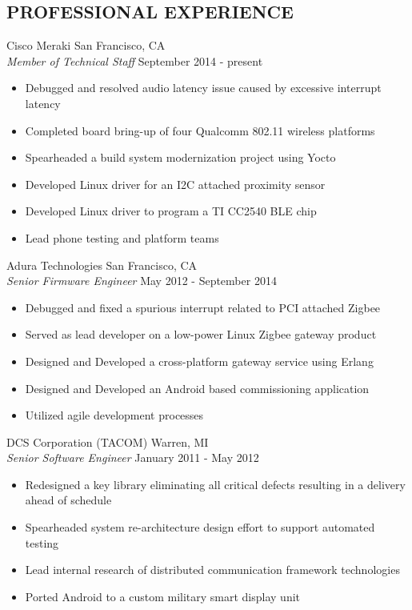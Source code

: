 \documentclass[line]{res}
\begin{document}
\begin{resume}
\section{PROFESSIONAL EXPERIENCE}
    \vspace{1mm}
    Cisco Meraki  \hfill San Francisco, CA\\
    {\sl Member of Technical Staff} \hfill September  2014 - present
    \vspace{1mm}
    \begin{itemize}
        \item Debugged and resolved audio latency issue caused by excessive interrupt latency
        \item Completed board bring-up of four Qualcomm 802.11 wireless platforms
        \item Spearheaded a build system modernization project using Yocto
        \item Developed Linux driver for an I2C attached proximity sensor
        \item Developed Linux driver to program a TI CC2540 BLE chip
        \item Lead phone testing and platform teams
    \end{itemize}
    \vspace{1mm}
    Adura Technologies  \hfill San Francisco, CA\\
    {\sl Senior Firmware Engineer} \hfill May  2012 - September 2014
    \vspace{1mm}
    \begin{itemize}
       \item Debugged and fixed a spurious interrupt related to PCI attached Zigbee
       \item Served as lead developer on a low-power Linux Zigbee gateway product
       \item Designed and Developed a cross-platform gateway service using Erlang
       \item Designed and Developed an Android based commissioning application
       \item Utilized agile development processes
    \end{itemize}
    \vspace{-1mm}
    DCS Corporation (TACOM)  \hfill Warren, MI\\
    {\sl Senior Software Engineer} \hfill January 2011 - May 2012
    \vspace{1mm}
    \begin{itemize}
       \item Redesigned a key library eliminating all critical defects resulting in a delivery ahead of schedule
       \item Spearheaded system re-architecture design effort to support automated testing
       \item Lead internal research of distributed communication framework technologies
       \item Ported Android to a custom military smart display unit
    \end{itemize}


\end{resume}
\end{document}
